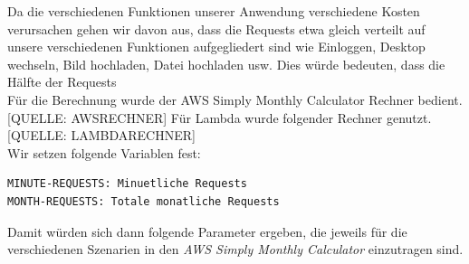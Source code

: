 \documentclass[a4paper, 12pt]{scrreprt}
\renewcommand\_{\textunderscore\allowbreak}
\begin{document}
Da die verschiedenen Funktionen unserer Anwendung verschiedene Kosten verursachen gehen wir davon aus, dass die Requests etwa gleich verteilt auf unsere verschiedenen Funktionen aufgegliedert sind wie Einloggen, Desktop wechseln, Bild hochladen, Datei hochladen usw. Dies würde bedeuten, dass die Hälfte der Requests \\
Für die Berechnung wurde der AWS Simply Monthly Calculator Rechner bedient. [QUELLE: AWSRECHNER] Für Lambda wurde folgender Rechner genutzt. [QUELLE: LAMBDARECHNER]
\\
Wir setzen folgende Variablen fest:
\begin{lstlisting}
MINUTE-REQUESTS: Minuetliche Requests
MONTH-REQUESTS: Totale monatliche Requests
\end{lstlisting} 
Damit würden sich dann folgende Parameter ergeben, die jeweils für die verschiedenen Szenarien in den \textit{AWS Simply Monthly Calculator} einzutragen sind.
\end{document}
